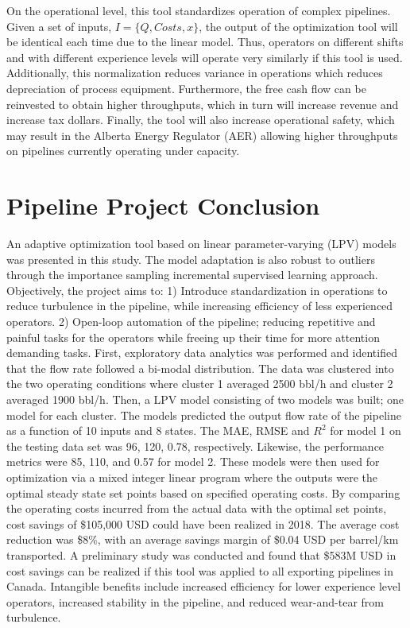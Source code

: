 On the operational level, this tool standardizes operation of complex pipelines. Given a set of inputs, $I = \{Q, Costs, x\}$, the output of the optimization tool will be identical each time due to the linear model. Thus, operators on different shifts and with different experience levels will operate very similarly if this tool is used.  Additionally, this normalization reduces variance in operations which reduces depreciation of process equipment. Furthermore, the free cash flow can be reinvested to obtain higher throughputs, which in turn will increase revenue and increase tax dollars.  Finally, the tool will also increase operational safety, which may result in the Alberta Energy Regulator (AER) allowing higher throughputs on pipelines currently operating under capacity.

\section{Pipeline Project Conclusion}
An adaptive optimization tool based on linear parameter-varying (LPV) models was presented in this study. The model adaptation is also robust to outliers through the importance sampling incremental supervised learning approach.  Objectively, the project aims to: 1) Introduce standardization in operations to reduce turbulence in the pipeline, while increasing efficiency of less experienced operators. 2) Open-loop automation of the pipeline; reducing repetitive and painful tasks for the operators while freeing up their time for more attention demanding tasks.  First, exploratory data analytics was performed and identified that the flow rate followed a bi-modal distribution.  The data was clustered into the two operating conditions where cluster 1 averaged 2500 bbl/h and cluster 2 averaged 1900 bbl/h.  Then, a LPV model consisting of two models was built; one model for each cluster. The models predicted the output flow rate of the pipeline as a function of 10 inputs and 8 states. The MAE, RMSE and $R^2$ for model 1 on the testing data set was 96, 120, 0.78, respectively.  Likewise, the performance metrics were 85, 110, and 0.57 for model 2.  These models were then used for optimization via a mixed integer linear program where the outputs were the optimal steady state set points based on specified operating costs.  By comparing the operating costs incurred from the actual data with the optimal set points, cost savings of \$105,000 USD could have been realized in 2018.  The average cost reduction was \$8\%, with an average savings margin of \$0.04 USD per barrel/km transported.  A preliminary study was conducted and found that \$583M USD in cost savings can be realized if this tool was applied to all exporting pipelines in Canada. Intangible benefits include increased efficiency for lower experience level operators, increased stability in the pipeline, and reduced wear-and-tear from turbulence.
